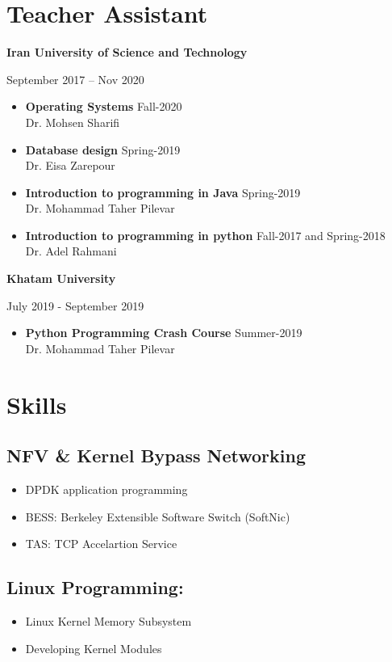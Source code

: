\documentclass[11pt]{article}
\begin{document}
\section{Teacher Assistant}
\noindent \textbf{Iran University of Science and Technology} \par
September 2017 – Nov 2020
{
    \renewcommand\labelitemi{}
\begin{itemize}
    \item {\textbf{Operating Systems}  \null\hfill Fall-2020 \\ Dr. Mohsen Sharifi}
    \item {\textbf{Database design} \null\hfill Spring-2019 \\ Dr. Eisa Zarepour }
    \item {\textbf{Introduction to programming in Java} \null\hfill Spring-2019 \\
        Dr. Mohammad Taher Pilevar}
    \item {\textbf{Introduction to programming in python} \null\hfill Fall-2017 and Spring-2018 \\
 Dr. Adel Rahmani }
\end{itemize}
}

{
\renewcommand\labelitemi{}
\noindent \textbf{Khatam University} \par
July 2019 - September 2019
\begin{itemize}
    \item {\textbf{Python Programming Crash Course}  \null\hfill Summer-2019 \\
        Dr. Mohammad Taher Pilevar}
\end{itemize}
}


\section{Skills}
\subsection{NFV \& Kernel Bypass Networking}
\begin{itemize}
    \item DPDK application programming
    \item BESS: Berkeley Extensible Software Switch (SoftNic)
    \item TAS: TCP Accelartion Service
\end{itemize}


\subsection{Linux Programming:}
\begin{itemize}
    \item Linux Kernel Memory Subsystem
    \item Developing Kernel Modules
\end{itemize}
\end{document}
